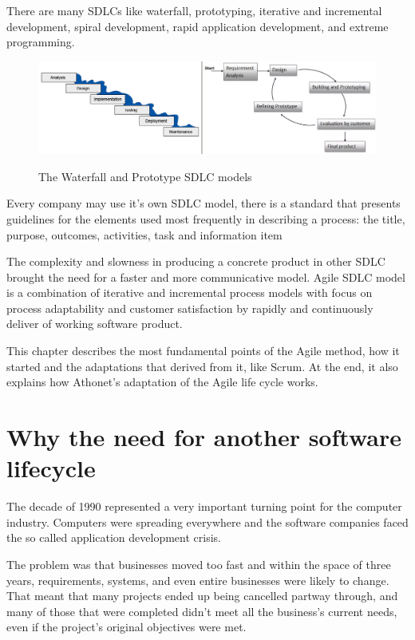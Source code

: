 There are many SDLCs like waterfall, prototyping, iterative and incremental development, spiral development, rapid application development, and extreme programming. 

\begin{figure}[H]
	\centering
	\includegraphics[width=.6\textwidth]{resources/warterfall_prototype}\\
	\caption{The Waterfall and Prototype SDLC models}
\end{figure}

Every company may use it's own SDLC model, there is a standard that presents guidelines for the elements used most frequently in describing a process: the title, purpose, outcomes, activities, task and information item

The complexity and slowness in producing a concrete product in other SDLC brought the need for a faster and more communicative model.
Agile SDLC model is a combination of iterative and incremental process models with focus on process adaptability and customer satisfaction by rapidly and continuously deliver of working software product.

This chapter describes the most fundamental points of the Agile method, how it started and the adaptations that derived from it, like Scrum.
At the end, it also explains how Athonet's adaptation of the Agile life cycle works.

\section{Why the need for another software lifecycle}

	The decade of 1990 represented a very important turning point for the computer industry.
	Computers were spreading everywhere and the software companies faced the so called application development crisis.
	
	The problem was that businesses moved too fast and within the space of three years, requirements, systems, and even entire businesses were likely to change.
	That meant that many projects ended up being cancelled partway through, and many of those that were completed didn't meet all the business's current needs, even if the project's original objectives were met.

